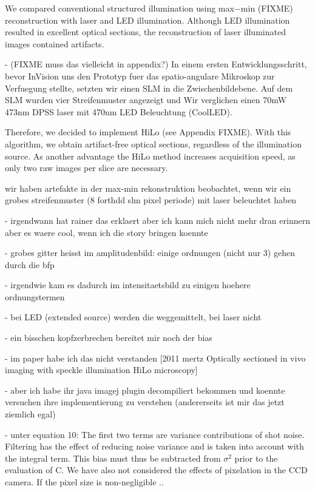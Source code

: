 We compared conventional structured illumination using max$-$min
(FIXME) reconstruction with laser and LED illumination. Although LED
illumination resulted in excellent optical sections, the
reconstruction of laser illuminated images contained artifacts.

{\color{red} - (FIXME muss das vielleicht in appendix?) In einem
ersten Entwicklungsschritt, bevor InVision uns den Prototyp fuer das
spatio-angulare Mikroskop zur Verfuegung stellte, setzten wir einen
SLM in die Zwischenbildebene. Auf dem SLM wurden vier Streifenmuster
angezeigt und Wir verglichen einen 70mW 473nm DPSS laser mit 470nm LED
Beleuchtung (CoolLED).}

Therefore, we decided to implement HiLo (see Appendix FIXME). With
this algorithm, we obtain artifact-free optical sections, regardless
of the illumination source. As another advantage the HiLo method
increases acquisition speed, as only two raw images per slice are
necessary.


{\color{red} wir haben artefakte in der max-min rekonstruktion
beobachtet, wenn wir ein grobes streifenmuster (8 forthdd slm pixel
periode) mit laser beleuchtet haben

     - irgendwann hat rainer das erklaert aber ich kann mich nicht
mehr dran erinnern aber es waere cool, wenn ich die story bringen
koennte
     
- grobes gitter heisst im amplitudenbild: einige ordnungen (nicht nur
3) gehen durch die bfp

     - irgendwie kam es dadurch im intensitaetsbild zu einigen hoehere
ordnungstermen

     - bei LED (extended source) werden die weggemittelt, bei laser
nicht

       - ein bisschen kopfzerbrechen bereitet mir noch der bias

       - im paper habe ich das nicht verstanden [2011 mertz Optically
sectioned in vivo imaging with speckle illumination HiLo microscopy]

       - aber ich habe ihr java imagej plugin decompiliert bekommen
und koennte versuchen ihre implementierung zu verstehen (andererseits
ist mir das jetzt ziemlich egal)

       - unter equation 10: The first two terms are variance
contributions of shot noise. Filtering has the effect of reducing
noise variance and is taken into account with the integral term. This
bias must thus be subtracted from $\sigma^2$ prior to the evaluation
of C. We have also not considered the effects of pixelation in the CCD
camera. If the pixel size is non-negligible ..  }

